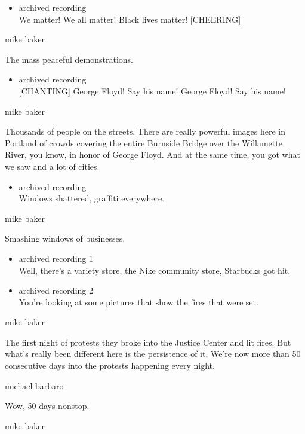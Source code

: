 \begin{itemize}
\tightlist
\item
  archived recording\\
  We matter! We all matter! Black lives matter! {[}CHEERING{]}
\end{itemize}

mike baker

The mass peaceful demonstrations.

\begin{itemize}
\tightlist
\item
  archived recording\\
  {[}CHANTING{]} George Floyd! Say his name! George Floyd! Say his name!
\end{itemize}

mike baker

Thousands of people on the streets. There are really powerful images
here in Portland of crowds covering the entire Burnside Bridge over the
Willamette River, you know, in honor of George Floyd. And at the same
time, you got what we saw and a lot of cities.

\begin{itemize}
\tightlist
\item
  archived recording\\
  Windows shattered, graffiti everywhere.
\end{itemize}

mike baker

Smashing windows of businesses.

\begin{itemize}
\item
  archived recording 1\\
  Well, there's a variety store, the Nike community store, Starbucks got
  hit.
\item
  archived recording 2\\
  You're looking at some pictures that show the fires that were set.
\end{itemize}

mike baker

The first night of protests they broke into the Justice Center and lit
fires. But what's really been different here is the persistence of it.
We're now more than 50 consecutive days into the protests happening
every night.

michael barbaro

Wow, 50 days nonstop.

mike baker

